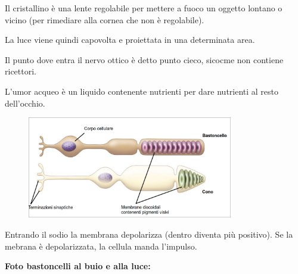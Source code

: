 \documentclass[a4paper]{article}
\begin{document}
Il cristallino è una lente regolabile per mettere a fuoco un oggetto lontano o vicino
(per rimediare alla cornea che non è regolabile).

La luce viene quindi capovolta e proiettata in una determinata area.

Il punto dove entra il nervo ottico è detto punto cieco, sicocme non contiene ricettori.

L'umor acqueo è un liquido contenente nutrienti per dare nutrienti al resto dell'occhio.

\begin{center}
\begin{figure}[ht]
    \centering
    \includegraphics[width=0.8\textwidth]{./rods.png}
\end{figure}
\end{center}

Entrando il sodio la membrana depolarizza (dentro diventa più positivo).
Se la mebrana è depolarizzata, la cellula manda l'impulso.

\textbf{Foto bastoncelli al buio e alla luce:}
\end{document}
